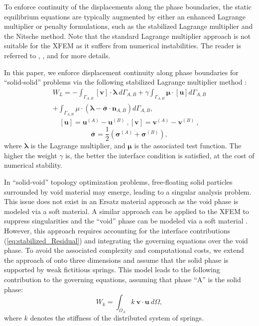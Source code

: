 To enforce continuity of the displacements along the phase boundaries, the static equilibrium equations are typically augmented by either an enhanced Lagrange multiplier or penalty formulations, such as the stabilized Lagrange multiplier and the Nitsche method. Note that the standard Lagrange multiplier approach is not suitable for the XFEM as it suffers from numerical instabilities. The reader is referred to \citet{Stenberg:95}, \citet{JS:09}, and \citet{DH:09} for more details.

In this paper, we enforce displacement continuity along phase boundaries for ``solid-solid'' problems via the following stabilized Lagrange multiplier method \citep{MM:13}:
%
\begin{multline}
\label{eq:stabilized_Residual}
	W_{L} = - \int_{\Gamma_{A,B}} \left[ \mathbf{v} \right] \cdot \pmb{\lambda} \ d \Gamma_{A,B}
		  + \gamma \int_{\Gamma_{A,B}} \pmb{\mu} \cdot \left[ \mathbf{u} \right] d \Gamma_{A,B} \\
		  + \int_{\Gamma_{A,B}} \mu \cdot \left( \pmb{\lambda} - \bar{\pmb{\sigma}} \cdot \mathbf{n}_{A,B} \right) d \Gamma_{A,B},
\end{multline}
%
\begin{equation} \label{jump}
	\left[ \mathbf{u} \right] = \mathbf{u}^{(A)} - \mathbf{u}^{(B)} \ ,
	\left[ \mathbf{v} \right] = \mathbf{v}^{(A)} - \mathbf{v}^{(B)} \ ,
\end{equation}
%
\begin{equation}
\label{eq:lagrangeStress}
	\bar{\pmb{\sigma}} = \frac{1}{2} \left( \pmb{\sigma}^{(A)} + \pmb{\sigma}^{(B)} \right),
\end{equation}
%
where $\pmb{\lambda}$ is the Lagrange multiplier, and $\pmb{\mu}$ is the associated test function. The higher the weight $\gamma$ is, the better the interface condition is satisfied, at the cost of numerical stability.

In ``solid-void'' topology optimization problems, free-floating solid particles surrounded by void material may emerge, leading to a singular analysis problem. This issue does not exist in an Ersatz material approach as the void phase is modeled via a soft material. A similar approach can be applied to the XFEM to suppress singularities and the ``void'' phase can be modeled via a soft material \citep{WWX:10}. However, this approach requires accounting for the interface contributions (\ref{eq:stabilized_Residual}) and integrating the governing equations over the void phase. To avoid the associated complexity and computational costs, we extend the approach of \citet{MM:13} onto three dimensions and assume that the solid phase is supported by weak fictitious springs. This model leads to the following contribution to the governing equations, assuming that phase ``A'' is the solid phase:
%
\begin{equation}
\label{eq:residual-k}
	W_{k} = \int_{\Omega_A} { k \ \mathbf{v} \cdot \mathbf{u} \ d \Omega },
\end{equation}
%
where $k$ denotes the stiffness of the distributed system of springs.

